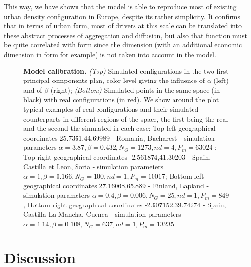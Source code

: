 \documentclass[10pt,letterpaper]{article}
\begin{document}
This way, we have shown that the model is able to reproduce most of existing urban density configuration in Europe, despite its rather simplicity. It confirms that in terms of urban form, most of drivers at this scale can be translated into these abstract processes of aggregation and diffusion, but also that function must be quite correlated with form since the  dimension  (with an additional economic dimension in form for example) is not taken into account in the model.


\begin{figure}
\caption{\textbf{Model calibration.} \textit{(Top)} Simulated configurations in the two first principal components plan, color level giving the influence of $\alpha$ (left) and of $\beta$ (right); \textit{(Bottom)} Simulated points in the same space (in black) with real configurations (in red). We show around the plot typical examples of real configurations and their simulated counterparts in different regions of the space, the first being the real and the second the simulated in each case: Top left geographical coordinates 25.7361,44.69989 - Romania, Bucharest - simulation parameters $\alpha=3.87,\beta=0.432,N_G=1273,nd=4,P_m=63024$ ; Top right geographical coordinates -2.561874,41.30203 - Spain, Castilla et Leon, Soria - simulation parameters $\alpha=1,\beta=0.166,N_G=100,nd=1,P_m=10017$; Bottom left geographical coordinates 27.16068,65.889 - Finland, Lapland - simulation parameters $\alpha=0.4,\beta=0.006,N_G=25,nd=1,P_m=849$; Bottom right geographical coordinates -2.607152,39.74274 - Spain, Castilla-La Mancha, Cuenca - simulation parameters $\alpha=1.14,\beta=0.108,N_G=637,nd=1,P_m=13235$.}
\label{fig:densitycalib}
\end{figure}







\section*{Discussion}


\paragraph{}
\end{document}
